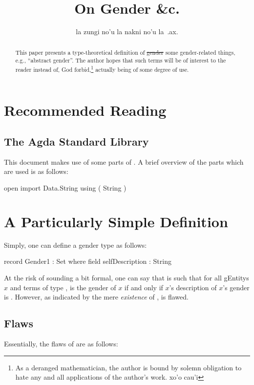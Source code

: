 \documentclass{article}
\title{On Gender \&c.}
\author{la zungi no'u la nakni no'u la\ .ax.}
\begin{document}
\maketitle{}

\begin{abstract}
This paper presents a type-theoretical definition of \st{gender} some gender-related things, e.g., ``abstract gender''.  The author hopes that such terms will be of interest to the reader instead of, God forbid,\footnote{As a deranged mathematician, the author is bound by solemn obligation to hate any and all applications of the author's work.  xo'o cau'i} actually being of some degree of use.
\end{abstract}

\section{Recommended Reading}

\subsection{The Agda Standard Library}
This document makes use of some parts of \textcite{agdaStdlib}.  A brief overview of the parts which are used is as follows:

\begin{code}
open import Data.String
  using
    ( String
    )
\end{code}

\section{A Particularly Simple Definition}
Simply, one can define a gender type  as follows:

\begin{code}
record Gender1 : Set where
  field
    selfDescription : String
\end{code}

At the risk of sounding a bit formal, one can say that  is such that for all \glspl{gEntity} \(x\) and terms  of type ,  is the gender of \(x\) if and only if \(x\)'s description of \(x\)'s gender is  .  However, as indicated by the mere \emph{existence} of ,  is flawed.

\subsection{Flaws}\label{sec:gender1flaws}
Essentially, the flaws of  are as follows:
\end{document}
